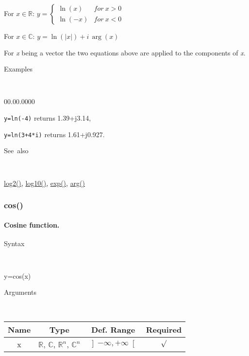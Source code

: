 \medskip{}
For $x\in\mathbb{R}$: $y=\left\{ \begin{array}{cc}
\ln\left(x\right) & for\: x>0\\
\ln\left(-x\right) & for\: x<0\end{array}\right.$ 

\medskip{}
For $x\in\mathbb{C}$: $y=\ln\left(\left|x\right|\right)+i\,\arg\left(x\right)$
\medskip{}

\noindent For \textit{x} being a vector the two equations above are
applied to the components of \textit{x}.

\begin{description}
\item [Examples]~
\end{description}
\begin{lyxlist}{00.00.0000}
\item [\texttt{y=ln(-4)}]returns 1.39+j3.14,
\item [\texttt{y=ln(3+4{*}i)}]returns 1.61+j0.927.
\end{lyxlist}
\begin{description}
\item [See~also]~
\end{description}
\textcolor{blue}{\hyperlink{log2}{log2()}}\textcolor{black}{,} \textcolor{blue}{\hyperlink{log10}{log10()}}\textcolor{black}{,}
\textcolor{blue}{\hyperlink{exp}{exp()}}\textcolor{black}{,} \textcolor{blue}{\hyperlink{arg}{arg()}}


\newpage
{}


\subsubsection*{\hypertarget{cos}{}{\Large cos()}}


\paragraph{\label{par:Cosine}Cosine function.}

\begin{description}
\item [Syntax]~
\end{description}
y=cos(x)

\begin{description}
\item [Arguments]~
\end{description}
\begin{tabular}{|c|c|c|c|}
\hline 
Name&
Type&
Def. Range&
Required\tabularnewline
\hline
\hline 
x&
$\mathbb{R}$, $\mathbb{C}$, $\mathbb{R}^{n}$, $\mathbb{C}^{n}$&
$\left]-\infty,+\infty\right[$&
$\surd$\tabularnewline
\hline
\end{tabular}


